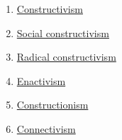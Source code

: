 \begin{enumerate}
\def\labelenumi{\arabic{enumi}.}
\item
  \href{http://en.wikipedia.org/wiki/Constructivism_(philosophy_of_education)}{Constructivism}
\item
  \href{http://en.wikipedia.org/wiki/Social_constructivism}{Social
  constructivism}
\item
  \href{http://www.english.iup.edu/mmwimson/Syllabi/803/721/Radical\%20Constructivism\%20\%20\%20721.htm}{Radical
  constructivism}
\item
  \href{http://en.wikipedia.org/wiki/Enactivism_(psychology)}{Enactivism}
\item
  \href{http://en.wikipedia.org/wiki/Constructionism_(learning_theory)}{Constructionism}
\item
  \href{http://en.wikipedia.org/wiki/Connectivism}{Connectivism}
\end{enumerate}
